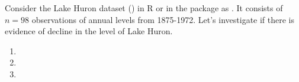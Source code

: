 Consider the Lake Huron dataset () in R or in the package  as . It consists of $n=98$ observations of annual levels from 1875-1972. Let's investigate if there is evidence of decline in the level of Lake Huron.

\begin{enumerate}[label=(\alph*)]
    \item 
    \item 
    \item 
\end{enumerate}